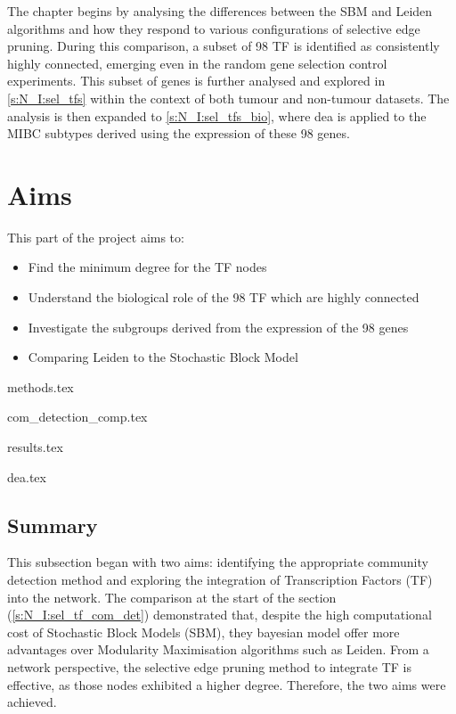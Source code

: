 The chapter begins by analysing the differences between the SBM and Leiden algorithms and how they respond to various configurations of selective edge pruning. During this comparison, a subset of 98 TF is identified as consistently highly connected, emerging even in the random gene selection control experiments. This subset of genes is further analysed and explored in \cref{s:N_I:sel_tfs} within the context of both tumour and non-tumour datasets. The analysis is then expanded to \cref{s:N_I:sel_tfs_bio}, where \acrfull{dea} is applied to the MIBC subtypes derived using the expression of these 98 genes.

\section{Aims}

This part of the project aims to:
\begin{itemize}
    \item Find the minimum degree for the TF nodes
    \item Understand the biological role of the 98 TF which are highly connected
    \item Investigate the subgroups derived from the expression of the 98 genes
    \item Comparing Leiden to the Stochastic Block Model
\end{itemize}


{methods.tex}

{com_detection_comp.tex}

{results.tex}

{dea.tex}


\subsection{Summary}

This subsection began with two aims: identifying the appropriate community detection method and exploring the integration of Transcription Factors (TF) into the network. The comparison at the start of the section (\ref{s:N_I:sel_tf_com_det}) demonstrated that, despite the high computational cost of Stochastic Block Models (SBM), they bayesian model offer more advantages over Modularity Maximisation algorithms such as Leiden. From a network perspective, the selective edge pruning method to integrate TF is effective, as those nodes exhibited a higher degree. Therefore, the two aims were achieved.

